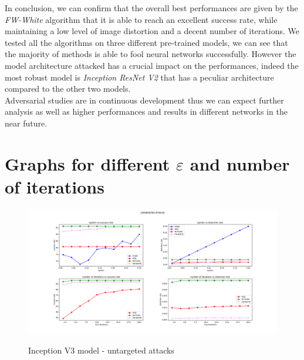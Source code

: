 \documentclass[10pt,twocolumn,letterpaper, english]{article}
\theoremstyle{definition}
\theoremstyle{plain}
\theoremstyle{plain}
\theoremstyle{plain}
\theoremstyle{plain}
\theoremstyle{remark}
\theoremstyle{remark}
\theoremstyle{definition}
\theoremstyle{definition}
\theoremstyle{definition}
\theoremstyle{definition}
\renewcommand{\epsilon}{\varepsilon}
\begin{document}
In conclusion, we can confirm that the overall best performances are given by the \textit{FW-White} algorithm that it is able to reach an excellent success rate, while maintaining a low level of image distortion and a decent number of iterations.
We tested all the algorithms on three different pre-trained models, we can see that the majority of methods is able to fool neural networks successfully. However the model architecture attacked has a crucial impact on the performances, indeed the most robust model is \textit{Inception ResNet V2} that has a peculiar architecture compared to the other two models.\\

Adversarial studies are in continuous development thus we can expect further analysis as well as higher performances and results in different networks in the near future.





{\small


}


\newpage 
\onecolumn 


\appendix
\section{Graphs for different $\epsilon$ and number of iterations} \label{appendix-fig}


\begin{figure}[ht]
  \centering
  \includegraphics[width=\textwidth]{./Images/inceptionv3_untargeted_grid.pdf}\\
  \caption{Inception V3 model - untargeted attacks } \label{incV3-unt}
\end{figure}
\end{document}
